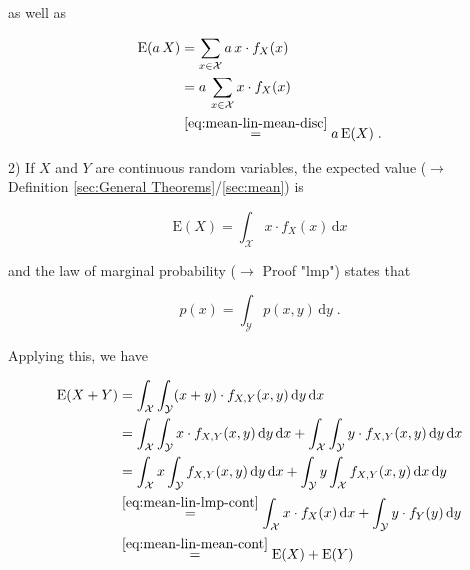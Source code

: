 \documentclass[a4paper,12pt]{book}
\begin{document}
as well as

\begin{equation} \label{eq:mean-lin-mean-lin-s2-disc}
\begin{split}
\mathrm{E}(a\,X) &= \sum_{x \in \mathcal{X}} a \, x \cdot f_X(x) \\
&= a \, \sum_{x \in \mathcal{X}} x \cdot f_X(x) \\
&\overset{\eqref{eq:mean-lin-mean-disc}}{=} a \, \mathrm{E}(X) \; .
\end{split}
\end{equation}

\vspace{1em}
2) If $X$ and $Y$ are continuous random variables, the expected value ($\rightarrow$ Definition \ref{sec:General Theorems}/\ref{sec:mean}) is

\begin{equation} \label{eq:mean-lin-mean-cont}
\mathrm{E}(X) = \int_{\mathcal{X}} x \cdot f_X(x) \, \mathrm{d}x
\end{equation}

and the law of marginal probability ($\rightarrow$ Proof "lmp") states that

\begin{equation} \label{eq:mean-lin-lmp-cont}
p(x) = \int_{\mathcal{Y}} p(x,y) \, \mathrm{d}y \; .
\end{equation}

Applying this, we have

\begin{equation} \label{eq:mean-lin-mean-lin-s1-cont}
\begin{split}
\mathrm{E}(X + Y) &= \int_{\mathcal{X}} \int_{\mathcal{Y}} (x+y) \cdot f_{X,Y}(x,y) \, \mathrm{d}y \, \mathrm{d}x \\
&= \int_{\mathcal{X}} \int_{\mathcal{Y}} x \cdot f_{X,Y}(x,y) \, \mathrm{d}y \, \mathrm{d}x + \int_{\mathcal{X}} \int_{\mathcal{Y}} y \cdot f_{X,Y}(x,y) \, \mathrm{d}y \, \mathrm{d}x \\
&= \int_{\mathcal{X}} x \int_{\mathcal{Y}} f_{X,Y}(x,y) \, \mathrm{d}y \, \mathrm{d}x + \int_{\mathcal{Y}} y \int_{\mathcal{X}} f_{X,Y}(x,y) \, \mathrm{d}x \, \mathrm{d}y \\
&\overset{\eqref{eq:mean-lin-lmp-cont}}{=} \int_{\mathcal{X}} x \cdot f_X(x) \, \mathrm{d}x + \int_{\mathcal{Y}} y \cdot f_Y(y) \, \mathrm{d}y \\
&\overset{\eqref{eq:mean-lin-mean-cont}}{=} \mathrm{E}(X) + \mathrm{E}(Y)
\end{split}
\end{equation}
\end{document}
